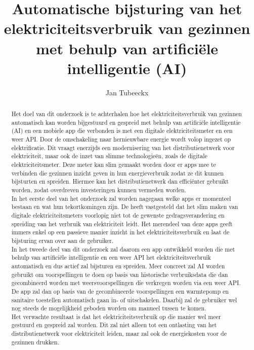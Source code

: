 \documentclass{hogent-article}
\title{Automatische bijsturing van het elektriciteitsverbruik van gezinnen met behulp van artificiële intelligentie (AI)}
\author{Jan Tubeeckx}
\begin{document}
\begin{abstract}
  Het doel van dit onderzoek is te achterhalen hoe het elektriciteitsverbruik van gezinnen automatisch kan worden bijgestuurd en gespreid met behulp van artificiële intelligentie (AI) en een mobiele app die verbonden is met een digitale elektriciteitsmeter en een weer API. Door de omschakeling naar hernieuwbare energie wordt volop ingezet op elektrificatie. Dit vraagt enerzijds een modernisering van het distributienetwerk voor elektriciteit, maar  ook de inzet van slimme technologieën, zoals de digitale elektriciteitsmeter. Deze meter kan slim gemaakt worden door er apps mee te verbinden die gezinnen inzicht geven in hun energieverbruik zodat ze dit kunnen bijsturten en spreiden. Hiermee kan het distributienetwerk dan efficiënter gebruikt worden, zodat overdreven investeringen kunnen vermeden worden. \\
  
  In het eerste deel van het onderzoek zal worden nagegaan welke apps er momenteel bestaan en wat hun tekortkomingen zijn. De \textcite{VREG2021} heeft vastgesteld dat het slim maken van digitale elektriciteitsmeters voorlopig niet tot de gewenste gedragsverandering en spreiding van het verbruik van elektriciteit leidt. Het merendeel van deze apps geeft immers enkel op een passieve manier inzicht in het elektriciteitsverbruik en laat de bijsturing ervan over aan de gebruiker. \\
  
  In het tweede deel van dit onderzoek zal daarom een app ontwikkeld worden die met behulp van artificiële intelligentie en een weer API het elektriciteitsverbruik automatisch en dus actief zal bijsturen en spreiden. Meer concreet zal AI worden gebruikt om voorspellingen te doen op basis van historische verbruiksdata die dan gecombineerd worden met weersvoorspellingen die verkregen worden via een weer API. De app zal dan op basis van de gecombineerde voorspellingen een warmtepomp en sanitaire toestellen automatisch gaan in- of uitschakelen. Daarbij zal de gebruiker wel nog steeds de mogelijkheid geboden worden om manueel tussen te komen. \\
  
  Het verwachte resultaat is dat het elektriciteitsverbruik op die manier wel meer gestuurd en gespreid zal worden. Dit zal niet alleen tot een ontlasting van het distributienetwerk voor elektriciteit leiden, maar zal ook de energiekosten voor de gezinnen drukken.
  
\end{abstract}
\end{document}

